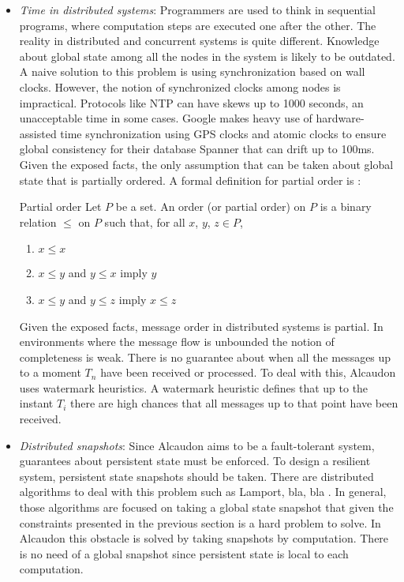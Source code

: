 \begin{itemize}
\item \textit{Time in distributed systems}:
  Programmers are used to think in sequential programs, where computation steps
  are executed one after the other. The reality in distributed and concurrent
  systems is quite different. Knowledge about global state among all the nodes
  in the system is likely to be outdated. A naive solution to this problem is
  using synchronization based on wall clocks. However, the notion of
  synchronized clocks among nodes is impractical. Protocols like NTP\cite{ntp}
  can have skews up to 1000 seconds, an unacceptable time in some cases. Google
  makes heavy use of hardware-assisted time synchronization using GPS clocks and
  atomic clocks to ensure global consistency for their database
  Spanner\cite{180268} that can drift up to 100ms. Given the exposed facts, the
  only assumption that can be taken about global state that is partially
  ordered. A formal definition for partial order is \cite{book:lattices}:
\begin{definition}{Partial order}
  Let $P$ be a set. An order (or partial order) on $P$ is a binary relation
  $\leq$ on $P$ such that, for all $x$, $y$, $z \in P$,
  \begin{enumerate}
  \item $x \leq x$
  \item $x \leq y$ and $y \leq x$ imply $y$
  \item $x \leq y$ and $y \leq z$ imply $x \leq z$
  \end{enumerate}
\end{definition}
  Given the exposed facts, message order in distributed systems is partial. In
  environments where the message flow is unbounded the notion of completeness is
  weak. There is no guarantee about when all the messages up to a moment $T_n$
  have been received or processed. To deal with this, Alcaudon uses watermark
  heuristics. A watermark heuristic defines that up to the instant $T_i$ there
  are high chances that all messages up to that point have been received.
\item \textit{Distributed snapshots}:
  Since Alcaudon aims to be a fault-tolerant system, guarantees about persistent
  state must be enforced. To design a resilient system, persistent state
  snapshots should be taken. There are distributed algorithms to deal with this
  problem such as Lamport, bla, bla . In general, those algorithms are focused
  on taking a global state snapshot that given the constraints presented in the
  previous section is a hard problem to solve. In Alcaudon this obstacle is
  solved by taking snapshots by computation. There is no need of a global
  snapshot since persistent state is local to each computation.


\end{itemize}
